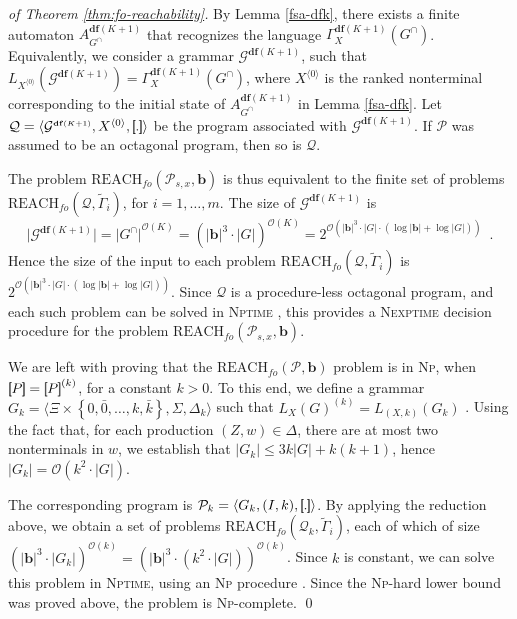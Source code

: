 \documentclass[final]{llncs}
\newcommand{\rbr}{{\bf ]\!\!]}}
\newcommand{\lbr}{{\bf [\!\![}}
\newcommand{\sem}[1]{\lbr #1 \rbr}
\def\set#1{{\left\{ #1 \right\}}}
\def\tuple#1{{\langle #1 \rangle}}
\def\len#1{{\vert{#1}\vert}}
\def\prod{\Delta}
\def\pat{{\mathbf{b}}}
\def\df#1{\scriptscriptstyle\mathbf{df}(#1)}
\def\Vars{\ensuremath{\Xi}}
\def\foreach{\mathrm{REACH}_{\mathit{fo}}}
\begin{document}
\begin{proof}[of Theorem \ref{thm:fo-reachability}]
  By Lemma \ref{fsa-dfk}, there exists a finite
  automaton \(A^{\df{K+1}}_{G^\cap}\) that recognizes the
  language \(\Gamma_X^{\df{K+1}}(G^\cap)\). Equivalently, we consider
  a grammar \(\mathcal{G}^{\df{K+1}}\), such
  that \(L_{X^{\tuple{0}}}(\mathcal{G}^{\df{K+1}})
  = \Gamma_X^{\df{K+1}}(G^\cap)\), where \(X^{\tuple{0}}\) is the
  ranked nonterminal corresponding to the initial state
  of \(A^{\df{K+1}}_{G^\cap}\) in
  Lemma \ref{fsa-dfk}. Let \(\mathcal{Q}
  = \tuple{\mathcal{G}^{\df{K+1}},X^{\tuple{0}},\sem{.}}\) be the
  program associated
  with \(\mathcal{G}^{\df{K+1}}\). If \(\mathcal{P}\) was assumed to
  be an octagonal program, then so is \(\mathcal{Q}\).

  The problem \(\foreach(\mathcal{P}_{s,x},\pat)\) is thus equivalent
  to the finite set of
  problems \(\foreach(\mathcal{Q},\widetilde{\Gamma}_i)\),
  for \(i=1,\ldots,m\). The size of \(\mathcal{G}^{\df{K+1}}\)
  is \[\len{\mathcal{G}^{\df{K+1}}} = \len{G^\cap}^{\mathcal{O}(K)} =
  (\len{\pat}^3 \cdot \len{G})^{\mathcal{O}(K)} =
  2^{\mathcal{O}(\len{\pat}^3 \cdot \len{G} \cdot (\log \len{\pat}
  + \log \len{G}))}\enspace.\] Hence the size of the input to each
  problem \(\foreach(\mathcal{Q},\widetilde{\Gamma}_i)\)
  is \(2^{\mathcal{O}(\len{\pat}^3 \cdot \len{G} \cdot
  (\log \len{\pat} + \log \len{G}))}\). Since \(\mathcal{Q}\) is a
  procedure-less octagonal program, and each such problem can be
  solved in \textsc{Nptime} \cite[Theorem 10]{bik14}, this provides
  a \textsc{Nexptime} decision procedure for the
  problem \(\foreach(\mathcal{P}_{s,x},\pat)\).

  We are left with proving that the \(\foreach(\mathcal{P},\pat)\)
  problem is in \textsc{Np}, when \(\sem{P}=\sem{P}^{(k)}\), for a
  constant \(k>0\). To this end, we define a
  grammar \(G_k=\tuple{\Vars \times \set{0,\bar{0},\ldots,k,\bar{k}}, \Sigma, \prod_k}\)
  such that \(L_X(G)^{(k)} = L_{(X,k)}(G_k)\) \cite[Definition
  3.1]{ls13}. Using the fact that, for each production
  $(Z,w)\in\prod$, there are at most two nonterminals in $w$, we
  establish that $\len{G_k}\leq 3k\len{G} + k(k+1)$, hence
  $\len{G_k}=\mathcal{O}(k^2 \cdot\len{G})$. 

  The corresponding program is \(\mathcal{P}_k
  = \tuple{G_k,(I,k),\sem{.}}\). By applying the reduction above, we
  obtain a set of
  problems \(\foreach(\mathcal{Q}_k,\widetilde{\Gamma}_i)\), each of
  which of size \((\len{\pat}^3 \cdot \len{G_k})^{\mathcal{O}(k)} =
  (\len{\pat}^3 \cdot (k^2 \cdot\len{G}))^{\mathcal{O}(k)}\). Since $k$ is
  constant, we can solve this problem in \textsc{Nptime}, using
  an \textsc{Np} procedure \cite[Theorem 10]{bik14}. Since
  the \textsc{Np}-hard lower bound was proved above, the problem
  is \textsc{Np}-complete. \qed
\end{proof}
\end{document}
